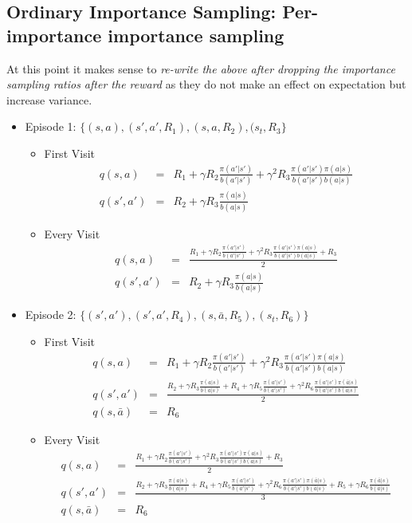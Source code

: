 \documentclass[11pt,a4paper]{article}
\newcommand\bea{\begin{eqnarray}}
\newcommand\eea{\end{eqnarray}}
\begin{document}
\subsection{Ordinary Importance Sampling: Per-importance importance sampling}

At this point it makes sense to {\em re-write the above after dropping the importance sampling ratios after the reward} as they do not make an effect on expectation but increase variance.
 
\begin{itemize}
\item Episode 1: $\{(s,a),(s',a',R_1),(s,a,R_2),(s_t,R_3\}$ 
\begin{itemize}
\item First Visit
\bea
q(s,a) &=& R_1 + \gamma R_2 \frac{\pi(a'|s')}{b(a'|s')} +\gamma^2 R_3 \frac{\pi(a'|s') \pi(a|s)}{b(a'|s') b(a|s)} \\
q(s',a') &=& R_2 + \gamma R_3 \frac{\pi(a|s)}{b(a|s)}
\eea
\item Every Visit
\bea
q(s,a) &=& \frac{R_1 + \gamma R_2 \frac{\pi(a'|s')}{b(a'|s')} +\gamma^2 R_3 \frac{\pi(a'|s') \pi(a|s)}{b(a'|s') b(a|s)} +R_3}{2} \\
q(s',a') &=& R_2 + \gamma R_3 \frac{\pi(a|s)}{b(a|s)}
\eea
\end{itemize}
\item  Episode 2: $\{(s',a'),(s',a',R_4),(s,\bar a,R_5),(s_t,R_6)\}$
\begin{itemize}
\item First Visit
\bea
q(s,a) &=&R_1 + \gamma R_2 \frac{\pi(a'|s')}{b(a'|s')} +\gamma^2 R_3 \frac{\pi(a'|s') \pi(a|s)}{b(a'|s') b(a|s)} \\
q(s',a') &=& \frac{R_2 + \gamma R_3 \frac{\pi(a|s)}{b(a|s)} + R_4 + \gamma R_5 \frac{\pi(a'|s') }{b(a'|s') } + \gamma^2 R_6 \frac{\pi(a'|s') \pi(\bar a|s)}{b(a'|s') b(\bar a|s)}}{2} \\
q(s,\bar a) &=& R_6
\eea
\item Every Visit
\bea
q(s,a) &=&  \frac{R_1 + \gamma R_2 \frac{\pi(a'|s')}{b(a'|s')} +\gamma^2 R_3 \frac{\pi(a'|s') \pi(a|s)}{b(a'|s') b(a|s)} +R_3}{2} \\
q(s',a') &=& \frac{R_2 + \gamma R_3 \frac{\pi(a|s)}{b(a|s)} + R_4 + \gamma R_5 \frac{\pi(a'|s') }{b(a'|s') } + \gamma^2 R_6 \frac{\pi(a'|s') \pi(\bar a|s)}{b(a'|s') b(\bar a|s)} + R_5+ \gamma R_6 \frac{ \pi(\bar a|s)}{ b(\bar a|s)}}{3} \\
q(s,\bar a) &=& R_6
\eea
\end{itemize}
\end{itemize}
\end{document}
